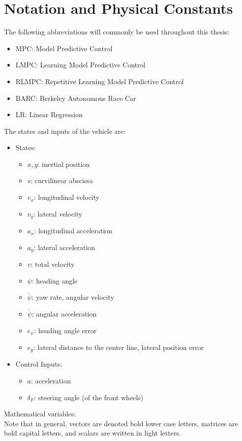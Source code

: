\chapter*{Notation and Physical Constants}
The following abbreviations will commonly be used throughout this thesis:
\begin{itemize}
	\item MPC: Model Predictive Control
	\item LMPC: Learning Model Predictive Control
	\item RLMPC: Repetitive Learning Model Predictive Control
	\item BARC: Berkeley Autonomous Race Car
	\item LR: Linear Regression
\end{itemize}
The states and inputs of the vehicle are:
\begin{itemize}
	\item States:
	\begin{itemize}
		\item $x,y$: inertial position
		\item $s$: curvilinear abscissa
		\item $v_x$: longitudinal velocity
		\item $v_y$: lateral velocity
		\item $a_x$: longitudinal acceleration
		\item $a_y$: lateral acceleration
		\item $v$: total velocity
		\item $\psi$: heading angle
		\item $\dot \psi$: yaw rate, angular velocity
		\item $\ddot \psi$: angular acceleration
		\item $e_\psi$: heading angle error
		\item $e_y$: lateral distance to the center line, lateral position error
	\end{itemize}
	\item Control Inputs:
	\begin{itemize}
		\item $ a$: acceleration
		\item $\delta_F$: steering angle (of the front wheels)	
	\end{itemize}
\end{itemize}
Mathematical variables:\\
Note that in general, vectors are denoted bold lower case letters, matrices are bold capital  letters, and scalars are written in light letters.
